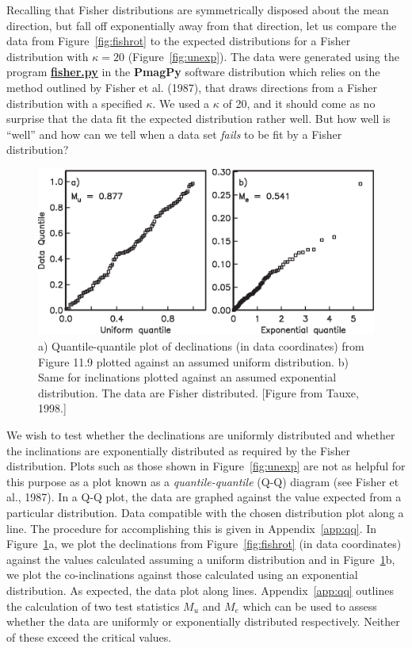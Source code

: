 Recalling that Fisher distributions are symmetrically disposed about the mean direction, but fall off exponentially away from that direction, let us compare the data from Figure~\ref{fig:fishrot} to the expected distributions
for a Fisher distribution with $\kappa = 20$ (Figure~\ref{fig:unexp}).
The data were generated  using the program \href{http://earthref.org/PmagPy/cookbook/#fisher.py}{\bf fisher.py} in the {\bf PmagPy} software distribution which relies on  the method 
outlined by 
%
Fisher et al. (1987),  that
draws directions from a Fisher distribution with a specified $\kappa$.
We used  a $\kappa$ of 20,  and it
should come as no surprise that the data fit the expected
distribution rather well.  But how well is ``well'' and how can we tell
when a data set {\it fails} to be fit by a Fisher distribution? 
\begin{figure}[htb]
\centering  \includegraphics[width= 11.25 cm]{EPSfiles/fishqq.eps}
\caption{
a) Quantile-quantile plot of declinations (in data coordinates) from Figure
11.9  plotted against an assumed uniform distribution. b) Same for inclinations
plotted against an assumed exponential distribution. The data are Fisher distributed. [Figure from Tauxe, 1998.]}
\label{fig:fishqq}
\end{figure}

We wish to test whether the declinations are uniformly distributed
and whether the inclinations are exponentially distributed
 as required by the Fisher
distribution.  Plots such as those shown in Figure~\ref{fig:unexp} are not
as helpful for this purpose as a plot known as a 
%
{\it quantile-quantile} (Q-Q) diagram
(see Fisher et al., 1987).
In  a Q-Q plot, the data are graphed against the value expected from a
particular distribution. Data compatible with the chosen distribution plot along
a line.  The procedure for accomplishing  this is given in Appendix~\ref{app:qq}.  
In Figure~\ref{fig:fishqq}a, we plot the declinations from
Figure~\ref{fig:fishrot} (in data coordinates) against the  values
calculated assuming a uniform distribution and in Figure~\ref{fig:fishqq}b,
we plot the co-inclinations against
those calculated using an exponential distribution.
 As expected, the data plot along  lines.  Appendix~\ref{app:qq} outlines the calculation of two test statistics $M_u$ and $M_e$ which can be used to assess whether the data are uniformly or exponentially distributed respectively.   Neither of these  exceed the critical values.  




